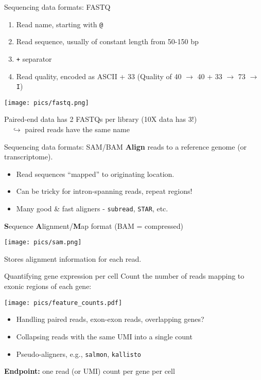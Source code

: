 \documentclass{beamer}
\begin{document}
\begin{frame}{Sequencing data formats: FASTQ}
\begin{enumerate}
\item Read name, starting with \texttt{@}
\item Read sequence, usually of constant length from 50-150 bp
\item \texttt{+} separator
\item Read quality, encoded as ASCII + 33 {\tiny (Quality of 40 $\to$ 40 + 33 $\to$ 73 $\to$ \texttt{I})}
\end{enumerate}
\begin{center}
\texttt{[image: pics/fastq.png]}
\end{center}
Paired-end data has 2 FASTQs per library (10X data has 3!)\\
$\quad\hookrightarrow$ paired reads have the same name      
\end{frame}

\begin{frame}{Sequencing data formats: SAM/BAM}
\textbf{Align} reads to a reference genome (or transcriptome).
\begin{itemize}
\item Read sequences ``mapped'' to originating location.
\item Can be tricky for intron-spanning reads, repeat regions!
\item Many good \& fast aligners - \texttt{subread}, \texttt{STAR}, etc.
\end{itemize}
\vspace{0.1in}
\textbf{S}equence \textbf{A}lignment/\textbf{M}ap format (BAM = compressed)
\begin{center}
\texttt{[image: pics/sam.png]}
\end{center}
Stores alignment information for each read.
\end{frame}

\begin{frame}{Quantifying gene expression per cell}
Count the number of reads mapping to exonic regions of each gene:
\begin{center}
\texttt{[image: pics/feature\_counts.pdf]}
\end{center}
\begin{itemize}
\item Handling paired reads, exon-exon reads, overlapping genes?
\item Collapsing reads with the same UMI into a single count
\item Pseudo-aligners, e.g., \texttt{salmon}, \texttt{kallisto}
\end{itemize}
\vspace{0.1in}
\textbf{Endpoint:} one read (or UMI) count per gene per cell
\end{frame}
\end{document}
